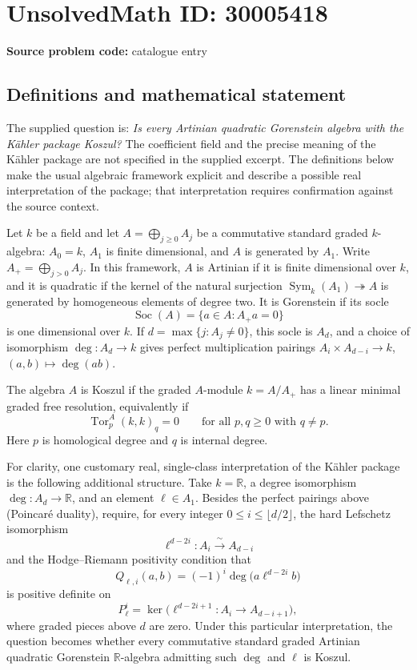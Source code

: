 \documentclass[11pt]{article}
\newcommand{\R}{\mathbb{R}}
\begin{document}
\section*{UnsolvedMath ID: 30005418}
\textbf{Source problem code:} catalogue entry
\subsection{Definitions and mathematical statement}
The supplied question is: \emph{Is every Artinian quadratic Gorenstein algebra with the Kähler package Koszul?} The coefficient field and the precise meaning of the Kähler package are not specified in the supplied excerpt. The definitions below make the usual algebraic framework explicit and describe a possible real interpretation of the package; that interpretation requires confirmation against the source context.

Let \(k\) be a field and let \(A=\bigoplus_{j\geq 0}A_j\) be a commutative standard graded \(k\)-algebra: \(A_0=k\), \(A_1\) is finite dimensional, and \(A\) is generated by \(A_1\). Write \(A_+=\bigoplus_{j>0}A_j\). In this framework, \(A\) is Artinian if it is finite dimensional over \(k\), and it is quadratic if the kernel of the natural surjection \(\operatorname{Sym}_k(A_1)\twoheadrightarrow A\) is generated by homogeneous elements of degree two. It is Gorenstein if its socle
\[
\operatorname{Soc}(A)=\{a\in A:A_+a=0\}
\]
is one dimensional over \(k\). If \(d=\max\{j:A_j\ne0\}\), this socle is \(A_d\), and a choice of isomorphism \(\deg:A_d\to k\) gives perfect multiplication pairings \(A_i\times A_{d-i}\to k\), \((a,b)\mapsto\deg(ab)\).

The algebra \(A\) is Koszul if the graded \(A\)-module \(k=A/A_+\) has a linear minimal graded free resolution, equivalently if
\[
\operatorname{Tor}^{A}_{p}(k,k)_q=0
\qquad\text{for all }p,q\geq0\text{ with }q\ne p.
\]
Here \(p\) is homological degree and \(q\) is internal degree.

For clarity, one customary real, single-class interpretation of the Kähler package is the following additional structure. Take \(k=\R\), a degree isomorphism \(\deg:A_d\to\R\), and an element \(\ell\in A_1\). Besides the perfect pairings above (Poincaré duality), require, for every integer \(0\leq i\leq\lfloor d/2\rfloor\), the hard Lefschetz isomorphism
\[
\ell^{d-2i}:A_i\xrightarrow{\ \sim\ }A_{d-i}
\]
and the Hodge--Riemann positivity condition that
\[
Q_{\ell,i}(a,b)=(-1)^i\deg\bigl(a\ell^{d-2i}b\bigr)
\]
is positive definite on
\[
P^i_{\ell}=\ker\bigl(\ell^{d-2i+1}:A_i\longrightarrow A_{d-i+1}\bigr),
\]
where graded pieces above \(d\) are zero. Under this particular interpretation, the question becomes whether every commutative standard graded Artinian quadratic Gorenstein \(\R\)-algebra admitting such \(\deg\) and \(\ell\) is Koszul.
\end{document}
